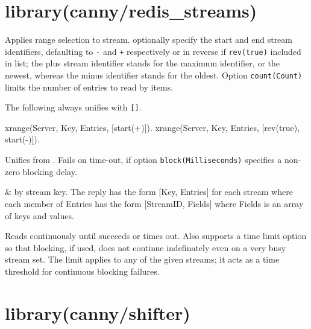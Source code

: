 \chapter{library(canny/redis_streams)}\label{sec:redisstreams}

\begin{description}
Applies range selection to  stream.  optionally specify
the start and end stream identifiers, defaulting to \verb$-$ and \verb$+$
respectively or in reverse if \verb$rev(true)$ included in  list;
the plus stream identifier stands for the maximum identifier, or
the newest, whereas the minus identifier stands for the oldest.
Option \verb$count(Count)$ limits the number of entries to read by
 items.

The following always unifies  with \verb$[]$.

\begin{code}
xrange(Server, Key, Entries, [start(+)]).
xrange(Server, Key, Entries, [rev(true), start(-)]).
\end{code}

Unifies  from . Fails on time-out, if option
\verb$block(Milliseconds)$ specifies a non-zero blocking delay.

\begin{arguments}
 & by stream key. The reply has the form [Key, Entries]
for each stream where each member of Entries has the form
[StreamID, Fields] where Fields is an array of keys and values. \\
\end{arguments}

\nodescription
Reads  continuously until  succeeds or times out. Also
supports a  time limit option so that blocking, if used, does
not continue indefinately even on a very busy stream set. The limit
applies to any of the given streams; it acts as a time threshold
for continuous blocking failures.
\end{description}

\chapter{library(canny/shifter)}\label{sec:shifter}

